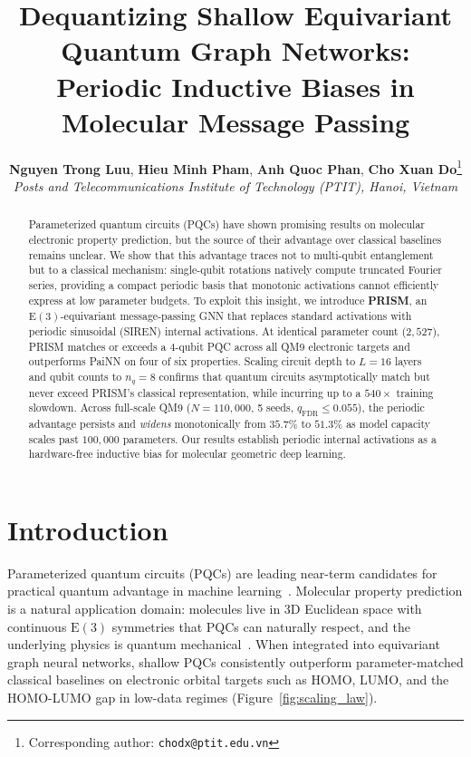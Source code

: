 \documentclass[10pt,twocolumn,letterpaper]{article}
\title{\textbf{Dequantizing Shallow Equivariant Quantum Graph Networks: Periodic Inductive Biases in Molecular Message Passing}}
\author{
    \textbf{Nguyen Trong Luu}, \textbf{Hieu Minh Pham}, \textbf{Anh Quoc Phan}, \textbf{Cho Xuan Do}\thanks{Corresponding author: \texttt{chodx@ptit.edu.vn}} \\
    \textit{Posts and Telecommunications Institute of Technology (PTIT), Hanoi, Vietnam}
}
\date{}
\begin{document}
\maketitle

\begin{abstract}
Parameterized quantum circuits (PQCs) have shown promising results on molecular electronic property prediction, but the source of their advantage over classical baselines remains unclear. We show that this advantage traces not to multi-qubit entanglement but to a classical mechanism: single-qubit rotations natively compute truncated Fourier series, providing a compact periodic basis that monotonic activations cannot efficiently express at low parameter budgets. To exploit this insight, we introduce \textbf{PRISM}, an $\mathrm{E}(3)$-equivariant message-passing GNN that replaces standard activations with periodic sinusoidal (SIREN) internal activations. At identical parameter count ($2{,}527$), PRISM matches or exceeds a 4-qubit PQC across all QM9 electronic targets and outperforms PaiNN on four of six properties. Scaling circuit depth to $L = 16$ layers and qubit counts to $n_q = 8$ confirms that quantum circuits asymptotically match but never exceed PRISM's classical representation, while incurring up to a $540\times$ training slowdown. Across full-scale QM9 ($N = 110{,}000$, 5 seeds, $q_{\mathrm{FDR}} \le 0.055$), the periodic advantage persists and \textit{widens} monotonically from $35.7\%$ to $51.3\%$ as model capacity scales past $100{,}000$ parameters. Our results establish periodic internal activations as a hardware-free inductive bias for molecular geometric deep learning.
\end{abstract}

\section{Introduction}
\label{sec:intro}


Parameterized quantum circuits (PQCs) are leading near-term candidates for practical quantum advantage in machine learning~\cite{Kandala:2017vok, Cerezo:2020mtn}. Molecular property prediction is a natural application domain: molecules live in 3D Euclidean space with continuous $\mathrm{E}(3)$ symmetries that PQCs can naturally respect, and the underlying physics is quantum mechanical~\cite{satorras2022enequivariantgraphneural, thomasTensorFieldNetworks2018}. When integrated into equivariant graph neural networks, shallow PQCs consistently outperform parameter-matched classical baselines on electronic orbital targets such as HOMO, LUMO, and the HOMO-LUMO gap in low-data regimes (Figure~\ref{fig:scaling_law}).
\end{document}
